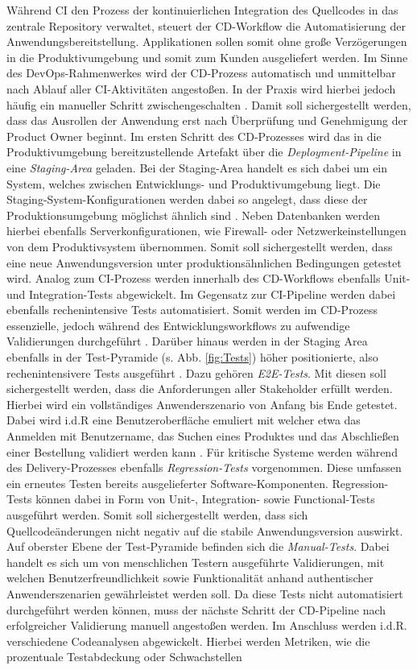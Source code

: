Während CI den Prozess der kontinuierlichen Integration des Quellcodes in das zentrale Repository verwaltet, steuert der CD-Workflow die Automatisierung der Anwendungsbereitstellung. Applikationen sollen somit ohne große Verzögerungen in die Produktivumgebung und somit zum Kunden ausgeliefert werden. Im Sinne des DevOps-Rahmenwerkes wird der CD-Prozess automatisch und unmittelbar nach Ablauf aller CI-Aktivitäten angestoßen. In der Praxis wird hierbei jedoch häufig ein manueller Schritt zwischengeschalten \cite[20]{Halstenberg.2020}. Damit soll sichergestellt werden, dass das Ausrollen der Anwendung erst nach Überprüfung und Genehmigung der Product Owner beginnt. Im ersten Schritt des CD-Prozesses wird das in die Produktivumgebung bereitzustellende Artefakt über die \textit{Deployment-Pipeline} in eine \textit{Staging-Area} geladen. Bei der Staging-Area handelt es sich dabei um ein System, welches zwischen Entwicklungs- und Produktivumgebung liegt. Die Staging-System-Konfigurationen werden dabei so angelegt, dass diese der Produktionsumgebung möglichst ähnlich sind \cite[Kap. 1.3]{Labouardy.2021}. Neben Datenbanken werden hierbei ebenfalls Serverkonfigurationen, wie Firewall- oder Netzwerkeinstellungen von dem Produktivsystem übernommen. Somit soll sichergestellt werden, dass eine neue Anwendungsversion unter produktionsähnlichen Bedingungen getestet wird. Analog zum CI-Prozess werden innerhalb des CD-Workflows ebenfalls Unit- und Integration-Tests abgewickelt. Im Gegensatz zur CI-Pipeline werden dabei ebenfalls rechenintensive Tests automatisiert. Somit werden im CD-Prozess essenzielle, jedoch während des Entwicklungsworkflows zu aufwendige Validierungen durchgeführt \cite[20]{Halstenberg.2020}. Darüber hinaus werden in der Staging Area ebenfalls in der Test-Pyramide (s. Abb. \ref*{fig:Tests}) höher positionierte, also rechenintensivere Tests ausgeführt \cite[Kap. 2]{Hambling.2015}. Dazu gehören \textit{\ac{E2E-Tests}}. Mit diesen soll sichergestellt werden, dass die Anforderungen aller Stakeholder erfüllt werden. Hierbei wird ein vollständiges Anwenderszenario von Anfang bis Ende getestet. Dabei wird i.d.R eine Benutzeroberfläche emuliert mit welcher etwa das Anmelden mit Benutzername, das Suchen eines Produktes und das Abschließen einer Bestellung validiert werden kann \cite{Bose.20230220}. Für kritische Systeme werden während des Delivery-Prozesses ebenfalls \textit{Regression-Tests} vorgenommen. Diese umfassen ein erneutes Testen bereits ausgelieferter Software-Komponenten. Regression-Tests können dabei in Form von Unit-, Integration- sowie Functional-Tests ausgeführt werden. Somit soll sichergestellt werden, dass sich Quellcodeänderungen nicht negativ auf die stabile Anwendungsversion auswirkt. Auf oberster Ebene der Test-Pyramide befinden sich die \textit{Manual-Tests}. Dabei handelt es sich um von menschlichen Testern ausgeführte Validierungen, mit welchen Benutzerfreundlichkeit sowie Funktionalität anhand authentischer Anwenderszenarien gewährleistet werden soll. Da diese Tests nicht automatisiert durchgeführt werden können, muss der nächste Schritt der CD-Pipeline nach erfolgreicher Validierung manuell angestoßen werden. Im Anschluss werden i.d.R. verschiedene Codeanalysen abgewickelt. Hierbei werden Metriken, wie die prozentuale Testabdeckung oder Schwachstellen 